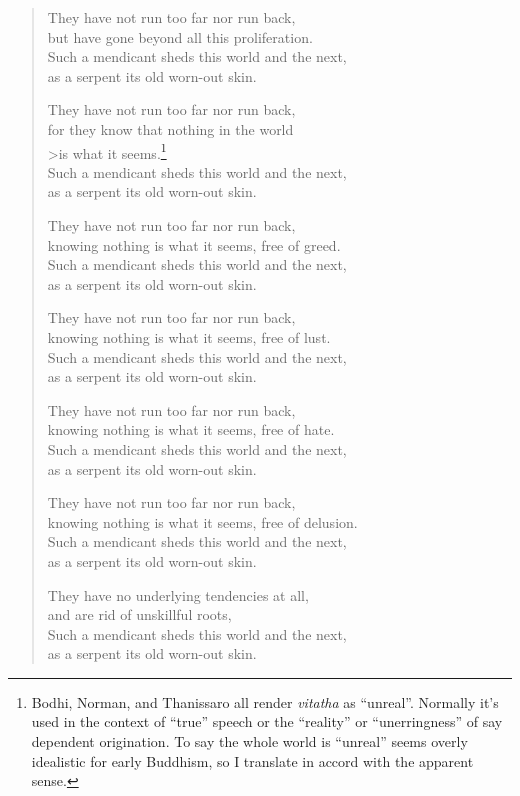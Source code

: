 \documentclass[12pt,openany]{book}%
\begin{document}
\begin{verse}
They have not run too far nor run back, \\
but have gone beyond all this proliferation. \\
Such a mendicant sheds this world and the next, \\
as a serpent its old worn-out skin. 

They have not run too far nor run back, \\
for they know that nothing in the world \\>is what it seems.\footnote{Bodhi, Norman, and Thanissaro all render \textit{vitatha} as “unreal”. Normally it’s used in the context of “true” speech or the “reality” or “unerringness” of say dependent origination. To say the whole world is “unreal” seems overly idealistic for early Buddhism, so I translate in accord with the apparent sense. } \\
Such a mendicant sheds this world and the next, \\
as a serpent its old worn-out skin. 

They have not run too far nor run back, \\
knowing nothing is what it seems, free of greed. \\
Such a mendicant sheds this world and the next, \\
as a serpent its old worn-out skin. 

They have not run too far nor run back, \\
knowing nothing is what it seems, free of lust. \\
Such a mendicant sheds this world and the next, \\
as a serpent its old worn-out skin. 

They have not run too far nor run back, \\
knowing nothing is what it seems, free of hate. \\
Such a mendicant sheds this world and the next, \\
as a serpent its old worn-out skin. 

They have not run too far nor run back, \\
knowing nothing is what it seems, free of delusion. \\
Such a mendicant sheds this world and the next, \\
as a serpent its old worn-out skin. 

They have no underlying tendencies at all, \\
and are rid of unskillful roots, \\
Such a mendicant sheds this world and the next, \\
as a serpent its old worn-out skin. 


\end{verse}
\end{document}
